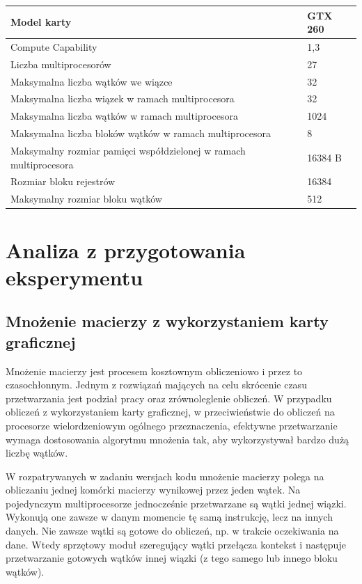 \documentclass[12pt,a4paper]{article}
\begin{document}
\begin{table}[H]
\centering
\def\arraystretch{1.5}
\begin{tabular}{|l|l|}
\hline
Model karty & GTX 260 \\
\hline
Compute Capability & 1,3 \\
\hline
Liczba multiprocesorów & 27 \\
\hline
Maksymalna liczba wątków we wiązce & 32 \\
\hline
Maksymalna liczba wiązek w ramach multiprocesora & 32 \\
\hline
Maksymalna liczba wątków w ramach multiprocesora & 1024 \\
\hline
Maksymalna liczba bloków wątków w ramach multiprocesora & 8 \\
\hline
Maksymalny rozmiar pamięci współdzielonej w ramach multiprocesora & 16384 B \\
\hline
Rozmiar bloku rejestrów & 16384 \\
\hline
Maksymalny rozmiar bloku wątków & 512 \\
\hline
\end{tabular}
\end{table}

\section{Analiza z przygotowania eksperymentu}

\subsection{Mnożenie macierzy z wykorzystaniem karty graficznej}

Mnożenie macierzy jest procesem kosztownym obliczeniowo i przez to czasochłonnym. Jednym z rozwiązań mających na celu skrócenie czasu przetwarzania jest podział pracy oraz zrównoleglenie obliczeń. W przypadku obliczeń z wykorzystaniem karty graficznej, w przeciwieństwie do obliczeń na procesorze wielordzeniowym ogólnego przeznaczenia, efektywne przetwarzanie wymaga dostosowania algorytmu mnożenia tak, aby wykorzystywał bardzo dużą liczbę wątków.

W rozpatrywanych w zadaniu wersjach kodu mnożenie macierzy polega na obliczaniu jednej komórki macierzy wynikowej przez jeden wątek. Na pojedynczym multiprocesorze jednocześnie przetwarzane są wątki jednej wiązki. Wykonują one zawsze w danym momencie tę samą instrukcję, lecz na innych danych. Nie zawsze wątki są gotowe do obliczeń, np. w trakcie oczekiwania na dane. Wtedy sprzętowy moduł szeregujący wątki przełącza kontekst i następuje przetwarzanie gotowych wątków innej wiązki (z tego samego lub innego bloku wątków).
\end{document}
